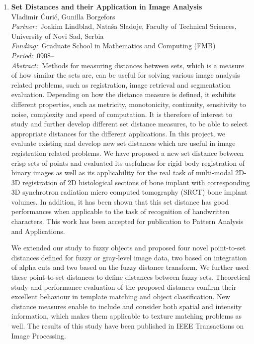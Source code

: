 \documentclass[10pt, a4paper]{article}
\newcommand{\aabstract}[1]{\emph{Abstract:~}#1}
\newcommand{\ffunding}[1]{\emph{Funding:~}#1\\}
\newcommand{\ppartner}[1]{\emph{Partner:~}#1\\}
\newcommand{\pperiod}[1]{\emph{Period:~}#1\\}
\begin{document}
\begin{enumerate}
\item
\label{proj:set_dist}
\textbf{Set Distances and their Application in Image Analysis}\\
Vladimir \' Curi\' c, Gunilla Borgefors\\
\ppartner{Joakim Lindblad, Nata\v sa Sladoje, Faculty of Technical Sciences, University of Novi Sad, Serbia}
\ffunding{Graduate School in Mathematics and Computing (FMB)}
\pperiod{0908--}
\aabstract{Methods for measuring distances between sets, which is a measure of how similar the sets are, can be useful for solving various image analysis related problems, such as registration, image retrieval and segmentation evaluation. Depending on how the distance measure is defined, it exhibits different properties, such as metricity, monotonicity, continuity, sensitivity to noise, complexity and speed of computation. It is therefore of interest to study and further develop different set distance measures, to be able to select appropriate distances for the different applications. In this project, we evaluate existing and develop new set distances which are useful in image registration related problems.
We have proposed a new set distance between crisp sets of points and evaluated its usefulness for rigid body registration of binary images as well as its applicability for the real task of multi-modal 2D-3D registration of 2D histological sections of bone implant with corresponding 3D synchrotron radiation micro computed tomography (SR\textmu CT) bone implant volumes. In addition, it has been shown that this set distance has good performances when applicable to the task of recognition of handwritten characters. This work has been accepted for publication to Pattern Analysis and Applications.

We extended our study to fuzzy objects and proposed four novel point-to-set distances defined for fuzzy or gray-level image data, two based on integration of alpha cuts and two based on the fuzzy distance transform. We further used these point-to-set distances to define distances between fuzzy sets. Theoretical study and performance evaluation of the proposed distances confirm their excellent behaviour in template matching and object classification. New distance measures enable to include and consider both spatial and intensity information, which makes them applicable to texture matching problems as well. The results of this study have been published in IEEE Transactions on Image Processing.}



\end{enumerate}
\end{document}
